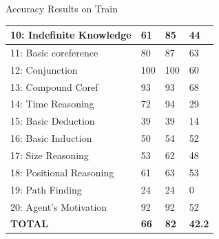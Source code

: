 \documentclass[pdf]{beamer}
\begin{document}
\begin{frame}{Accuracy Results on Train}
\begin{table}[]
{\begin{tabular}{|l|l|l|l|}
10: Indefinite Knowledge & 61                                                             & 85                                                              & 44       \\ \hline
11: Basic coreference    & 80                                                             & 87                                                              & 63       \\ \hline
12: Conjunction          & 100                                                            & 100                                                             & 60       \\ \hline
13: Compound Coref       & 93                                                             & 93                                                              & 68       \\ \hline
14: Time Reasoning       & 72                                                             & 94                                                              & 29       \\ \hline
15: Basic Deduction      & 39                                                             & 39                                                              & 14       \\ \hline
16: Basic Induction      & 50                                                             & 54                                                              & 52       \\ \hline
17: Size Reasoning       & 53                                                             & 62                                                              & 48       \\ \hline
18: Positional Reasoning & 61                                                             & 63                                                              & 53       \\ \hline
19: Path Finding         & 24                                                             & 24                                                              & 0        \\ \hline
20: Agent's Motivation   & 92                                                             & 92                                                              & 52       \\ \hline
\textbf{TOTAL}           & \textbf{66}                                                    & \textbf{82}                                                     &       \textbf{42.2}    \\ \hline
\end{tabular}
}
\end{table}
\end{frame}
\end{document}
